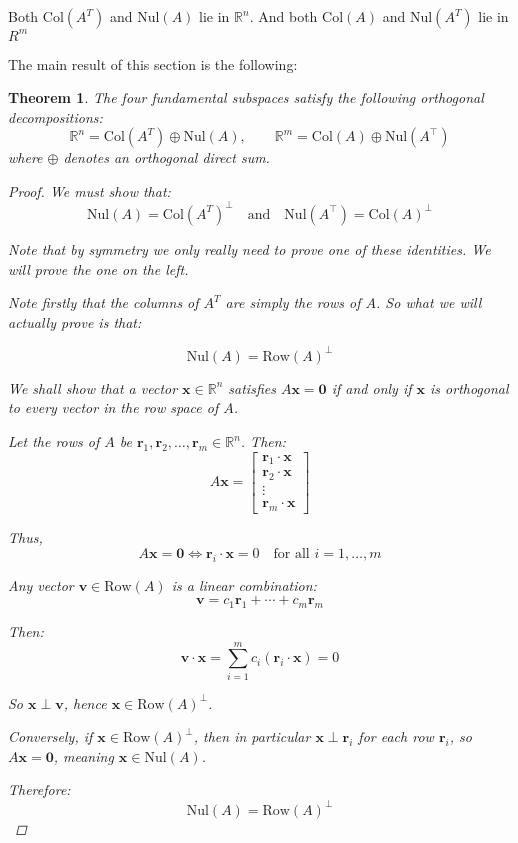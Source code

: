 \documentclass[11pt]{article}
\newtheorem{theorem}{Theorem}
\begin{document}
Both $\mathrm{Col}(A^T)$ and $\mathrm{Nul}(A)$ lie in $\mathbb{R}^n$. And both $\mathrm{Col}(A)$ and $\mathrm{Nul}(A^T)$ lie in $R^m$

The main result of this section is the following:

\begin{theorem}
The four fundamental subspaces satisfy the following orthogonal decompositions:
\[
\mathbb{R}^n = \mathrm{Col}(A^T) \oplus \mathrm{Nul}(A), \qquad
\mathbb{R}^m = \mathrm{Col}(A) \oplus \mathrm{Nul}(A^\top)
\]
where \( \oplus \) denotes an orthogonal direct sum.

\begin{proof}
We must show that:
\[
\boxed{\mathrm{Nul}(A) = \mathrm{Col}(A^T)^\perp} \quad \text{and} \quad \boxed{\mathrm{Nul}(A^\top) = \mathrm{Col}(A)^\perp}
\]

Note that by symmetry we only really need to prove one of these identities. We will prove the one on the left. 

Note firstly that the columns of $A^T$ are simply the rows of $A$.
So what we will actually prove is that:

\[ \mathrm{Nul}(A) = \mathrm{Row}(A)^\perp\]

We shall show that a vector \( \mathbf{x} \in \mathbb{R}^n \) satisfies \( A\mathbf{x} = \mathbf{0} \) if and only if \( \mathbf{x} \) is orthogonal to every vector in the row space of \( A \).

Let the rows of \( A \) be \( \mathbf{r}_1, \mathbf{r}_2, \dots, \mathbf{r}_m \in \mathbb{R}^n \). Then:
\[
A\mathbf{x} = 
\begin{bmatrix}
\mathbf{r}_1 \cdot \mathbf{x} \\
\mathbf{r}_2 \cdot \mathbf{x} \\
\vdots \\
\mathbf{r}_m \cdot \mathbf{x}
\end{bmatrix}
\]

Thus,
\[
A\mathbf{x} = \mathbf{0} \iff \mathbf{r}_i \cdot \mathbf{x} = 0 \quad \text{for all } i = 1, \dots, m
\]

Any vector \( \mathbf{v} \in \mathrm{Row}(A) \) is a linear combination:
\[
\mathbf{v} = c_1 \mathbf{r}_1 + \cdots + c_m \mathbf{r}_m
\]

Then:
\[
\mathbf{v} \cdot \mathbf{x} = \sum_{i=1}^m c_i (\mathbf{r}_i \cdot \mathbf{x}) = 0
\]

So \( \mathbf{x} \perp \mathbf{v} \), hence \( \mathbf{x} \in \mathrm{Row}(A)^\perp \).

Conversely, if \( \mathbf{x} \in \mathrm{Row}(A)^\perp \), then in particular \( \mathbf{x} \perp \mathbf{r}_i \) for each row \( \mathbf{r}_i \), so \( A\mathbf{x} = \mathbf{0} \), meaning \( \mathbf{x} \in \mathrm{Nul}(A) \).

Therefore:
\[
\boxed{\mathrm{Nul}(A) = \mathrm{Row}(A)^\perp}
\]



\end{proof}


\end{theorem}
\end{document}
